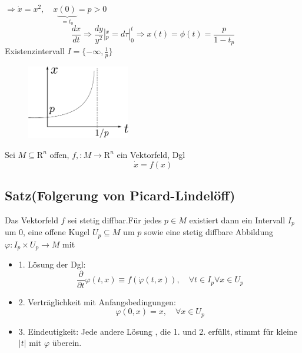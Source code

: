 \documentclass[ngerman]{tudscrreprt}
\begin{document}
$\Rightarrow \dot x = x^2 , \quad x\underbrace{(0)}_{=t_0} = p > 0$ 
\begin{equation*}
\frac{dx}{dt} \Rightarrow \frac{dy}{y^2}|_p^x = d\tau |_0^t \Rightarrow x(t) = \phi(t) = \frac{p}{1-t_p}
\end{equation*}
Existenzintervall $I = \{ -\infty, \frac{1}{p}\}$
\begin{figure}[H]
\centering
\def\svgwidth{200pt} 
  \includegraphics[width=4.5cm]{image17_2.pdf}
\end{figure}
Sei $M \subseteq \mathrm{R}^{n}$ offen, $f,:M \to \mathrm{R}^{n}$ ein Vektorfeld, Dgl \begin{equation*}
\dot x= f(x)
\end{equation*}
\subsection*{Satz(Folgerung von Picard-Lindelöff)}
Das Vektorfeld $f$ sei stetig diffbar.Für jedes $p \in M$ existiert dann ein Intervall $I_p$ um 0, eine offene Kugel $U_p \subseteq M$ um $p$ sowie eine stetig diffbare Abbildung $\varphi: I_p \times U_p \to M$ mit 
\begin{itemize}
\item{1.} Lösung der Dgl:
\begin{equation*}
\frac{\partial}{\partial t}\varphi(t,x) \equiv f(\dot{\varphi}(t,x)) ,\quad \forall t\in I_p \forall x \in U_p
\end{equation*}
\item{2.} Verträglichkeit mit Anfangsbedingungen:
\begin{equation*}
\varphi(0,x) = x, \quad \forall x \in U_p
\end{equation*}
\item{3.} Eindeutigkeit: Jede andere Lösung , die 1. und 2. erfüllt, stimmt für kleine $|t|$ mit $\varphi$ überein.
\end{itemize}
\end{document}
